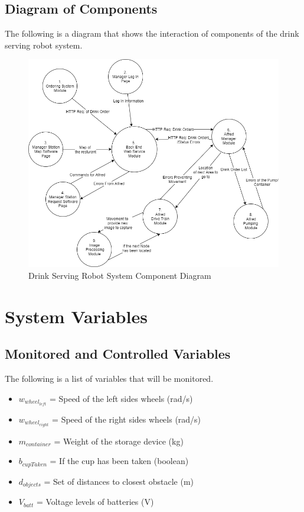 \documentclass [10pt]{article}
\begin{document}
\subsection{Diagram of Components}
The following is a diagram that shows the interaction of components of the drink serving robot system.
\begin{figure} [h!]
	\centering
	\includegraphics [scale = 0.6] {Figures/SystemComponents.png}
	\caption{Drink Serving Robot System Component Diagram}
\end{figure}
\section{System Variables}

\subsection{Monitored and Controlled Variables}
The following is a list of variables that will be monitored.

\begin{itemize}
	\item $w_{wheel_{left}}$ = Speed of the left sides wheels (rad/s)
	\item $w_{wheel_{right}}$ = Speed of the right sides wheels (rad/s)
	\item $m_{container}$ = Weight of the storage device (kg)
	\item $b_{cupTaken}$ = If the cup has been taken (boolean)
	\item $d_{objects}$ = Set of distances to closest obstacle (m)
	\item $V_{batt}$ = Voltage levels of batteries (V)
	
\end{itemize}
\end{document}
